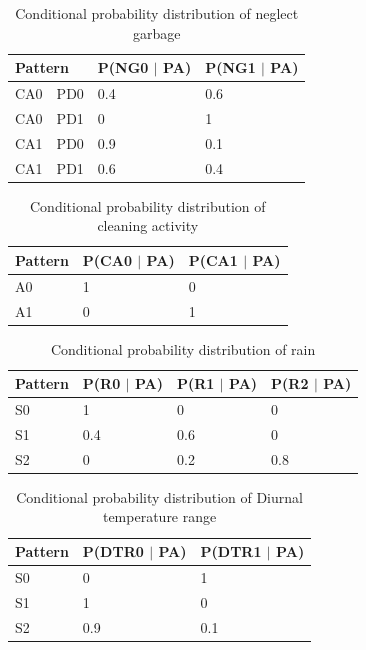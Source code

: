 \documentclass[review]{elsarticle}
\begin{document}
	\begin{table}[!htbp]
		\centering
		\normalsize
		\begin{tabular}{|l|l|l|l|}
			\hline
			\multicolumn{2}{|l|}{Pattern}  & P(NG0 $\mid$ PA) & P(NG1 $\mid$ PA)\\
			\hline
			CA0 & PD0 & 0.4 & 0.6\\
			\hline
			CA0 & PD1 & 0 & 1\\
			\hline
			CA1 & PD0 & 0.9 & 0.1\\
			\hline
			CA1 & PD1 & 0.6 & 0.4\\
			\hline
		\end{tabular}
		\caption{Conditional probability distribution of neglect garbage}
		\label{condition-grb}
	\end{table}
	
	\begin{table}[!htbp]
		\centering
		\normalsize
		\begin{tabular}{|l|l|l|}
			\hline
			Pattern & P(CA0 $\mid$ PA) & P(CA1 $\mid$ PA)\\
			\hline
			A0 & 1 & 0\\
			\hline
			A1 & 0 & 1\\
			\hline
		\end{tabular}
		\caption{Conditional probability distribution of cleaning activity}
		\label{condition-ca}
	\end{table}
	
	
	\begin{table}[!htbp]
		\centering
		\normalsize
		\begin{tabular}{|l|l|l|l|}
			\hline
			Pattern & P(R0 $\mid$ PA) & P(R1 $\mid$ PA) & P(R2 $\mid$ PA)\\
			\hline
			S0 & 1 & 0 & 0\\
			\hline
			S1 & 0.4 & 0.6 & 0\\
			\hline
			S2 & 0 & 0.2 & 0.8\\
			\hline
		\end{tabular}
		\caption{Conditional probability distribution of rain}
		\label{condition-rain}
	\end{table}
	
	\begin{table}[!htbp]
		\centering
		\normalsize
		\begin{tabular}{|l|l|l|}
			\hline
			Pattern & P(DTR0 $\mid$  PA) & P(DTR1 $\mid$  PA)\\
			\hline
			S0 & 0 & 1\\
			\hline
			S1 & 1 & 0\\
			\hline
			S2 & 0.9 & 0.1\\
			\hline
		\end{tabular}
		\caption{Conditional probability distribution of Diurnal temperature range}
		\label{condition-dtr}
	\end{table}
	
\end{document}

